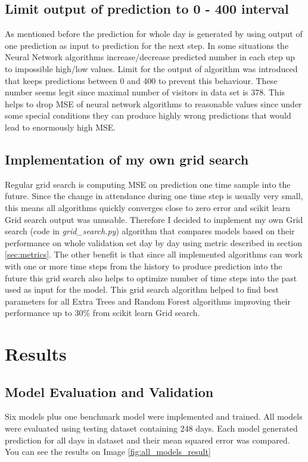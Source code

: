 \documentclass{article}
\begin{document}
\subsection{Limit output of prediction to 0 - 400 interval}
As mentioned before the prediction for whole day is generated by using output of one prediction as input to prediction for the next step. In some situations the Neural Network algorithms increase/decrease predicted number in each step up to impossible high/low values. Limit for the output of algorithm was introduced that keeps predictions between 0 and 400 to prevent this behaviour. These number seems legit since maximal number of visitors in data set is 378. This helps to drop MSE of neural network algorithms to reasonable values since under some special conditions they can produce highly wrong predictions that would lead to enormously high MSE.

\subsection{Implementation of my own grid search} \label{sec:my_grid_search}
Regular grid search is computing MSE on prediction one time sample into the future. Since the change in attendance during one time step is usually very small, this means all algorithms quickly converges close to zero error and scikit learn Grid search output was unusable. Therefore I decided to implement my own Grid search (code in \emph{grid\_search.py}) algorithm that compares models based on their performance on whole validation set day by day using metric described in section \ref{sec:metrics}. The other benefit is that since all implemented algorithms can work with one or more time steps from the history to produce prediction into the future this grid search also helps to optimize number of time steps into the past used as input for the model. This grid search algorithm helped to find best parameters for all Extra Trees and Random Forest algorithms improving their performance up to 30\% from scikit learn Grid search.

\section{Results}
\subsection{Model Evaluation and Validation}
Six models plus one benchmark model were implemented and trained. All models were evaluated using testing dataset containing 248 days. Each model generated prediction for all days in dataset and their mean squared error was compared. You can see the results on Image \ref{fig:all_models_result}  
\end{document}
